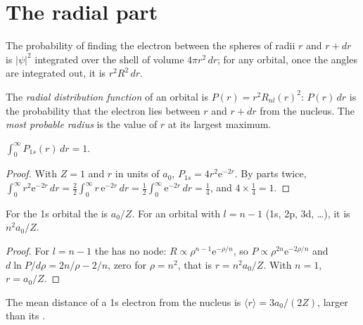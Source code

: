 \section{The radial part}

The probability of finding the electron between the spheres of radii $r$ and $r +
dr$ is $|\psi|^2$ integrated over the shell of volume $4\pi r^2\,dr$; for any
orbital, once the angles are integrated out, it is $r^2R^2\,dr$.

\begin{definition}\label{def:b2:atomic-orbitals:radial-distribution}
The \emph{radial distribution function} of
an orbital is $P(r) = r^2R_{nl}(r)^2$: $P(r)\,dr$ is the probability that the
electron lies between $r$ and $r + dr$ from the nucleus. The \emph{most probable
radius} is the value of $r$ at its largest maximum.
\end{definition}

\begin{proposition}[Normalisation of 1s]\label{prop:b2:atomic-orbitals:normalised}
$\int_0^\infty P_{1s}(r)\,dr = 1$.
\end{proposition}

\begin{proof}
With $Z = 1$ and $r$ in units of $a_0$, $P_{1s} = 4r^2\mathrm e^{-2r}$. By parts twice,
$\int_0^\infty r^2\mathrm e^{-2r}\,dr = \frac22\int_0^\infty r\,\mathrm e^{-2r}\,dr =
\frac12\int_0^\infty\mathrm e^{-2r}\,dr = \frac14$, and $4 \times \frac14 = 1$.
\end{proof}

\begin{proposition}\label{prop:b2:atomic-orbitals:most-probable}
For the 1s orbital the  is $a_0/Z$. For an orbital with $l =
n - 1$ (1s, 2p, 3d, \dots), it is $n^2a_0/Z$.
\end{proposition}

\begin{proof}
For $l = n - 1$ the  has no node: $R \propto \rho^{n-1}\mathrm e^{-\rho/n}$,
so $P \propto \rho^{2n}\mathrm e^{-2\rho/n}$ and $d\ln P/d\rho = 2n/\rho - 2/n$, zero
for $\rho = n^2$, that is $r = n^2a_0/Z$. With $n = 1$, $r = a_0/Z$.
\end{proof}

\begin{proposition}\label{prop:b2:atomic-orbitals:mean-radius}
The mean distance of a 1s electron from the nucleus is $\langle r\rangle = 3a_0/(2Z)$,
larger than its .
\end{proposition}

